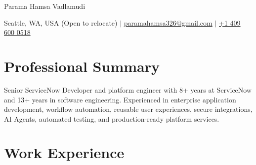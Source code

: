 ﻿\documentclass[10pt,letterpaper]{article}
\newenvironment{onecolentry}{}{}
\begin{document}
\begin{center}
    \fontsize{25pt}{25pt}\selectfont Parama Hamsa Vadlamudi

    \vspace{5pt}

    \normalsize
    Seattle, WA, USA (Open to relocate)
    \hspace{5pt}$|$\hspace{5pt}
    \href{mailto:paramahamsa326@gmail.com}{paramahamsa326@gmail.com}
    \hspace{5pt}$|$\hspace{5pt}
    \href{tel:+14096000518}{+1 409 600 0518}
\end{center}

\vspace{-0.10cm}

\section{Professional Summary}
\begin{onecolentry}
Senior ServiceNow Developer and platform engineer with 8+ years at ServiceNow and 13+ years in software engineering. Experienced in enterprise application development, workflow automation, reusable user experiences, secure integrations, AI Agents, automated testing, and production-ready platform services.
\end{onecolentry}

\section{Work Experience}
\end{document}
